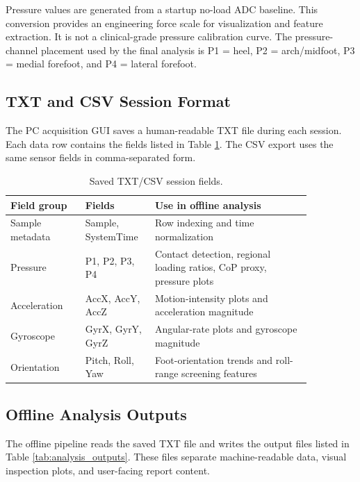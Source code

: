 Pressure values are generated from a startup no-load ADC baseline. This conversion provides an engineering force scale for visualization and feature extraction. It is not a clinical-grade pressure calibration curve. The pressure-channel placement used by the final analysis is P1 = heel, P2 = arch/midfoot, P3 = medial forefoot, and P4 = lateral forefoot.

\subsection{TXT and CSV Session Format}
\label{app:txt_csv_format}

The PC acquisition GUI saves a human-readable TXT file during each session. Each data row contains the fields listed in Table \ref{tab:txt_csv_format}. The CSV export uses the same sensor fields in comma-separated form.

\begin{table}[h]
\centering
\caption{Saved TXT/CSV session fields.}
\label{tab:txt_csv_format}
\begin{tabular}{|p{0.22\linewidth}|p{0.18\linewidth}|p{0.46\linewidth}|}
\hline
\textbf{Field group} & \textbf{Fields} & \textbf{Use in offline analysis} \\
\hline
Sample metadata & Sample, SystemTime & Row indexing and time normalization \\
\hline
Pressure & P1, P2, P3, P4 & Contact detection, regional loading ratios, CoP proxy, pressure plots \\
\hline
Acceleration & AccX, AccY, AccZ & Motion-intensity plots and acceleration magnitude \\
\hline
Gyroscope & GyrX, GyrY, GyrZ & Angular-rate plots and gyroscope magnitude \\
\hline
Orientation & Pitch, Roll, Yaw & Foot-orientation trends and roll-range screening features \\
\hline
\end{tabular}
\end{table}

\subsection{Offline Analysis Outputs}
\label{app:analysis_outputs}

The offline pipeline reads the saved TXT file and writes the output files listed in Table \ref{tab:analysis_outputs}. These files separate machine-readable data, visual inspection plots, and user-facing report content.

